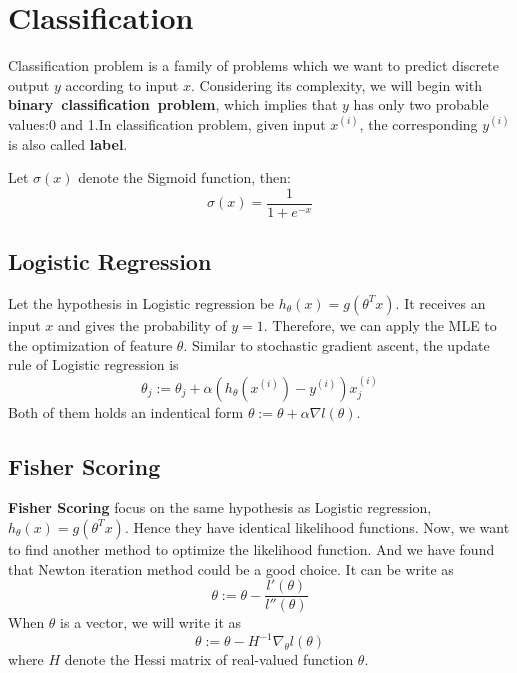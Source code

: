 \section{Classification}

Classification problem is a family of problems which we want to predict discrete output $y$ according to input $x$. Considering its complexity, we will begin with
\textbf{binary~classification~problem}, which implies that $y$ has only two probable values:0 and 1.In classification problem, given input $x^{(i)}$, the corresponding $y^{(i)}$ is also called
\textbf{label}.

\begin{define}
    Let $\sigma(x)$ denote the Sigmoid function, then:
    \[\sigma(x)=\frac{1}{1+e^{-x}}\]
\end{define}

\subsection{Logistic Regression}
Let the hypothesis in Logistic regression be $h_\theta(x) = g(\theta^Tx)$. It receives an input $x$ and gives the probability of $y=1$. Therefore, we can apply the MLE to the optimization of 
feature $\theta$. Similar to stochastic gradient ascent, the update rule of Logistic regression is 
\[\theta_j := \theta_j + \alpha(h_\theta(x^{(i)})-y^{(i)})x^{(i)}_j\]
Both of them holds an indentical form $\theta := \theta + \alpha\nabla l(\theta)$.

\subsection{Fisher Scoring}

\textbf{Fisher Scoring} focus on the same hypothesis as Logistic regression, $h_\theta(x) = g(\theta^Tx)$. Hence they have identical likelihood functions. Now, we want to find another method to
optimize the likelihood function. And we have found that Newton iteration method could be a good choice. It can be write as 
\[\theta := \theta - \frac{l'(\theta)}{l''(\theta)}\]
When $\theta$ is a vector, we will write it as 
\[\theta:=\theta-H^{-1}\nabla_\theta l(\theta)\]
where $H$ denote the Hessi matrix of real-valued function $\theta$.  
